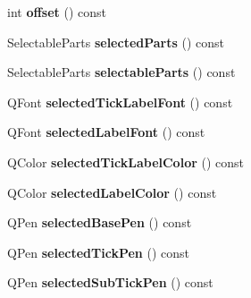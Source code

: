 \begin{DoxyCompactItemize}
\item 
int {\bfseries offset} () const \hypertarget{class_q_c_p_axis_aebc032ac6eea164a02859c017f52d5e7}{}\label{class_q_c_p_axis_aebc032ac6eea164a02859c017f52d5e7}

\item 
Selectable\+Parts {\bfseries selected\+Parts} () const \hypertarget{class_q_c_p_axis_a08323248a1cba4750ef07ceea159e0b3}{}\label{class_q_c_p_axis_a08323248a1cba4750ef07ceea159e0b3}

\item 
Selectable\+Parts {\bfseries selectable\+Parts} () const \hypertarget{class_q_c_p_axis_ad2bff3d2ed3d35c10d44c0c02441bd2c}{}\label{class_q_c_p_axis_ad2bff3d2ed3d35c10d44c0c02441bd2c}

\item 
Q\+Font {\bfseries selected\+Tick\+Label\+Font} () const \hypertarget{class_q_c_p_axis_ae245bb3dcd0ec71eee38437de6e719f7}{}\label{class_q_c_p_axis_ae245bb3dcd0ec71eee38437de6e719f7}

\item 
Q\+Font {\bfseries selected\+Label\+Font} () const \hypertarget{class_q_c_p_axis_a078bbc88b33595a5308350c2889c96d4}{}\label{class_q_c_p_axis_a078bbc88b33595a5308350c2889c96d4}

\item 
Q\+Color {\bfseries selected\+Tick\+Label\+Color} () const \hypertarget{class_q_c_p_axis_a5a3af4bd1a820bb7c6d4c85e1d8d452f}{}\label{class_q_c_p_axis_a5a3af4bd1a820bb7c6d4c85e1d8d452f}

\item 
Q\+Color {\bfseries selected\+Label\+Color} () const \hypertarget{class_q_c_p_axis_a8cf8de6ac7f1ca617e05412f669ed229}{}\label{class_q_c_p_axis_a8cf8de6ac7f1ca617e05412f669ed229}

\item 
Q\+Pen {\bfseries selected\+Base\+Pen} () const \hypertarget{class_q_c_p_axis_a5a3919ad7b60c2789b04c7e72387cfd6}{}\label{class_q_c_p_axis_a5a3919ad7b60c2789b04c7e72387cfd6}

\item 
Q\+Pen {\bfseries selected\+Tick\+Pen} () const \hypertarget{class_q_c_p_axis_a9f86ef82e1d1a908ab4c68cfa5fe4175}{}\label{class_q_c_p_axis_a9f86ef82e1d1a908ab4c68cfa5fe4175}

\item 
Q\+Pen {\bfseries selected\+Sub\+Tick\+Pen} () const \hypertarget{class_q_c_p_axis_a1b264fdfef48c22aba36e76de7856784}{}\label{class_q_c_p_axis_a1b264fdfef48c22aba36e76de7856784}


\end{DoxyCompactItemize}

